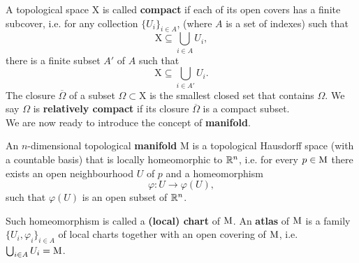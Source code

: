 \noindent A topological space $\mathrm{X}$ is called \textbf{compact} if each of its open covers has a finite subcover, i.e. for any collection $\{U_i\}_{i\in A}$, (where $A$ is a set of indexes) such that $$\mathrm{X}\subseteq\bigcup_{i\in A}U_i,$$ there is a finite subset $A'$ of $A$ such that $$ \mathrm{X}\subseteq\bigcup_{i\in A'}U_i.$$
The closure $\overline{\Omega}$ of a subset $\Omega\subset\mathrm{X}$ is the smallest closed set that contains $\Omega$. We say $\Omega$ is \textbf{relatively compact} if its closure $\overline{\Omega}$ is a compact subset.\\

\noindent We are now ready to introduce the concept of \textbf{manifold}.
\begin{definition}
	An $n$-dimensional topological \textbf{manifold} $\mathrm{M}$ is a topological Hausdorff space (with a countable basis) that is locally homeomorphic to ${\mathbb R}^n$, i.e. for every $p\in\mathrm{M}$ there exists an open neighbourhood $U$ of $p$ and a homeomorphism $$\varphi:U\to\varphi(U),$$ such that $\varphi(U)$ is an open subset of ${\mathbb R}^n$.
\end{definition}
	
	\noindent Such homeomorphism is called a \textbf{(local) chart} of $\mathrm{M}$. An \textbf{atlas} of $\mathrm{M}$ is a family $\{U_i,\varphi_i\}_{i\in A}$ of local charts together with an open covering of $\mathrm{M}$, i.e. $ \bigcup_{i\in A}U_i=\mathrm{M}$.

